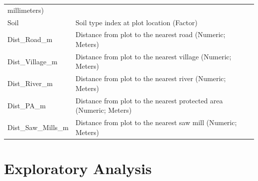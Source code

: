 \documentclass[12pt,]{article}
\begin{document}
\begin{longtable}[]{@{}ll@{}}
\begin{minipage}[t]{0.41\columnwidth}
millimeters)\strut
\end{minipage}\tabularnewline
\begin{minipage}[t]{0.53\columnwidth}\raggedright
Soil\strut
\end{minipage} & \begin{minipage}[t]{0.41\columnwidth}\raggedright
Soil type index at plot location (Factor)\strut
\end{minipage}\tabularnewline
\begin{minipage}[t]{0.53\columnwidth}\raggedright
Dist\_Road\_m\strut
\end{minipage} & \begin{minipage}[t]{0.41\columnwidth}\raggedright
Distance from plot to the nearest road (Numeric; Meters)\strut
\end{minipage}\tabularnewline
\begin{minipage}[t]{0.53\columnwidth}\raggedright
Dist\_Village\_m\strut
\end{minipage} & \begin{minipage}[t]{0.41\columnwidth}\raggedright
Distance from plot to the nearest village (Numeric; Meters)\strut
\end{minipage}\tabularnewline
\begin{minipage}[t]{0.53\columnwidth}\raggedright
Dist\_River\_m\strut
\end{minipage} & \begin{minipage}[t]{0.41\columnwidth}\raggedright
Distance from plot to the nearest river (Numeric; Meters)\strut
\end{minipage}\tabularnewline
\begin{minipage}[t]{0.53\columnwidth}\raggedright
Dist\_PA\_m\strut
\end{minipage} & \begin{minipage}[t]{0.41\columnwidth}\raggedright
Distance from plot to the nearest protected area (Numeric; Meters)\strut
\end{minipage}\tabularnewline
\begin{minipage}[t]{0.53\columnwidth}\raggedright
Dist\_Saw\_Mills\_m\strut
\end{minipage} & \begin{minipage}[t]{0.41\columnwidth}\raggedright
Distance from plot to the nearest saw mill (Numeric; Meters)\strut
\end{minipage}\tabularnewline
\bottomrule
\end{longtable}

\newpage

\hypertarget{exploratory-analysis}{%
\section{Exploratory Analysis}\label{exploratory-analysis}}
\end{document}
